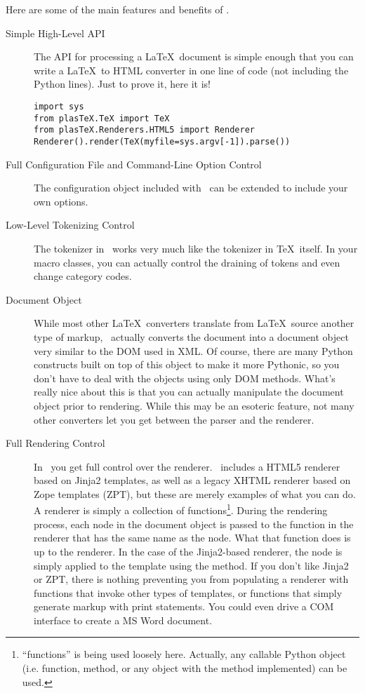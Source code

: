 Here are some of the main features and benefits of \plasTeX.
\begin{description}
\item[Simple High-Level API] The API for processing a \LaTeX\ document
is simple enough that you can write a \LaTeX\ to HTML converter
in one line of code (not including the Python  lines).
Just to prove it, here it is!
\begin{verbatim}
import sys
from plasTeX.TeX import TeX
from plasTeX.Renderers.HTML5 import Renderer
Renderer().render(TeX(myfile=sys.argv[-1]).parse())
\end{verbatim}

\item[Full Configuration File and Command-Line Option Control]
The configuration object included with \plasTeX\ can be extended to include
your own options.

\item[Low-Level Tokenizing Control] The tokenizer in \plasTeX\ works very 
much like the tokenizer in \TeX\ itself.  In your macro classes, you 
can actually control the draining of tokens and even change category codes.

\item[Document Object] While most other \LaTeX\ converters translate from
\LaTeX\ source another type of markup, \plasTeX\ actually converts the 
document into a document object very similar to the DOM used in XML.
Of course, there are many Python constructs built on top of this object
to make it more Pythonic, so you don't have to deal with the objects using
only DOM methods. What's really nice about this is that you can actually 
manipulate the document object prior to rendering.  While this may be an
esoteric feature, not many other converters let you get between the parser
and the renderer.

\item[Full Rendering Control] In \plasTeX\, you get full control over the
renderer. \plasTeX\ includes a HTML5 renderer based on Jinja2
templates, as well as a legacy XHTML renderer based on Zope templates (ZPT), 
but these are merely examples of what you can do.
A renderer is simply a collection of functions\footnote{``functions'' is being
used loosely here.  Actually, any callable Python object (i.e. function, method, 
or any object with the  method implemented) can be used.}.  
During the rendering
process, each node in the document object is passed to the function
in the renderer that has the same name as the node.  What that function
does is up to the renderer.  In the case of the Jinja2-based renderer, the 
node is simply applied to the template using the  method.
If you don't like Jinja2 or ZPT, there is nothing preventing you from populating
a renderer with functions that invoke other types of templates, or functions
that simply generate markup with print statements.  You could even drive
a COM interface to create a MS Word document.
\end{description}
